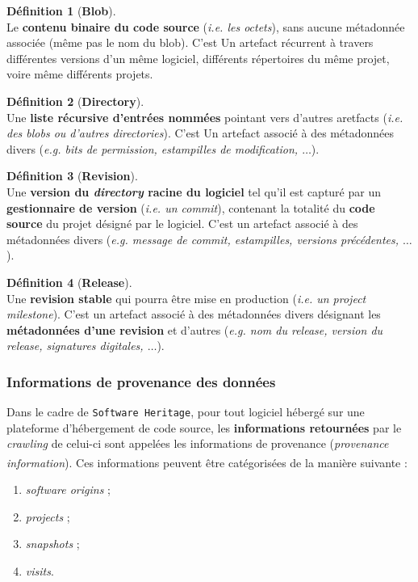 \documentclass[12pt,a4paper]{report}
\theoremstyle{definition}
\newtheorem*{definition}{Définition}
\begin{document}
\begin{definition}[\textbf{Blob}]\mbox{}\\
Le \textbf{contenu binaire du code source} (\textit{i.e. les octets}), sans aucune métadonnée associée (même pas le nom du blob). C'est Un artefact récurrent à travers différentes versions d'un même logiciel, différents répertoires du même projet, voire même différents projets.
\end{definition}

\begin{definition}[\textbf{Directory}]\mbox{}\\
Une \textbf{liste récursive d'entrées nommées} pointant vers d'autres aretfacts (\textit{i.e. des blobs ou d'autres directories}). C'est Un artefact associé à des métadonnées divers (\textit{e.g. bits de permission, estampilles de modification, $\dots$}).
\end{definition}

\begin{definition}[\textbf{Revision}]\mbox{}\\
Une \textbf{version du \textit{directory} racine du logiciel} tel qu'il est capturé par un \textbf{gestionnaire de version} (\textit{i.e. un commit}), contenant la totalité du \textbf{code source} du projet désigné par le logiciel. C'est un artefact associé à des métadonnées divers (\textit{e.g. message de commit, estampilles, versions précédentes, $\dots$}).
\end{definition}

\begin{definition}[\textbf{Release}]\mbox{}\\
Une \textbf{revision stable} qui pourra être mise en production (\textit{i.e. un project milestone}). C'est un artefact associé à des métadonnées divers désignant les \textbf{métadonnées d'une revision} et d'autres (\textit{e.g. nom du release, version du release, signatures digitales, $\dots$}).
\end{definition}

\subsubsection{Informations de provenance des données}
Dans le cadre de \texttt{Software Heritage}, pour tout logiciel hébergé sur une plateforme d'hébergement de code source, les \textbf{informations retournées} par le \textit{crawling} de celui-ci sont appelées les informations de provenance (\textit{provenance information})\textsuperscript{\citep{dicosmoWhyAndHow}}. Ces informations peuvent être catégorisées de la manière suivante :
\begin{enumerate}
	\item \textit{software origins} ;
	\item \textit{projects} ;
	\item \textit{snapshots} ;
	\item \textit{visits}.
\end{enumerate}
\end{document}
